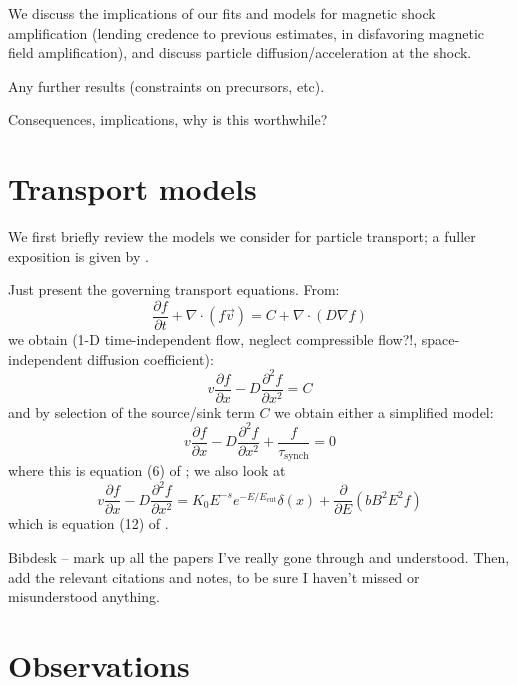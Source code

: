 \documentclass[manuscript]{aastex}  %
\newcommand{\mt}{\mathrm}
\newcommand{\ptl}{\partial}
\newcommand{\del}{\nabla}
\begin{document}
We discuss the implications of our fits and models for magnetic shock
amplification (lending credence to previous estimates, in disfavoring magnetic
field amplification), and discuss particle diffusion/acceleration at the shock.

Any further results (constraints on precursors, etc).

Consequences, implications, why is this worthwhile?

\section{Transport models}

We first briefly review the models we consider for particle transport; a fuller
exposition is given by .

Just present the governing transport equations.  From:
\[
  \frac{\ptl f}{\ptl t} + \del \cdot \left( f \vec{v} \right)
  = C + \del \cdot \left( D \del f \right)
\]
we obtain (1-D time-independent flow, neglect compressible flow?!,
space-independent diffusion coefficient):
\[
    v \frac{\ptl f}{\ptl x} - D \frac{\ptl^2 f}{\ptl x^2} = C
\]
and by selection of the source/sink term $C$ we obtain either a
simplified model:
\begin{equation} \label{eq:simp-mod}
    v \frac{\ptl f}{\ptl x} - D \frac{\ptl^2 f}{\ptl x^2} +
    \frac{f}{\tau_{\mt{synch}}} = 0
\end{equation}
where this is equation (6) of ; we also look at
\begin{equation} \label{eq:full-mod}
    v \frac{\ptl f}{\ptl x} - D \frac{\ptl^2 f}{\ptl x^2} =
    K_0 E^{-s} e^{-E/E_{\mt{cut}}} \delta(x) + \frac{\ptl}{\ptl E}
      \left(bB^2E^2f\right)
\end{equation}
which is equation (12) of .


Bibdesk -- mark up all the papers I've really gone through and understood.
Then, add the relevant citations and notes, to be sure I haven't missed or
misunderstood anything.

\section{Observations}
\end{document}
